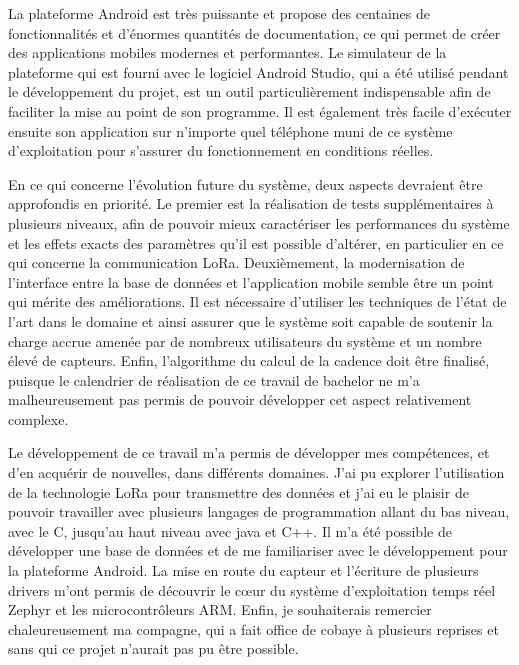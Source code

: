 La plateforme Android est très puissante et propose des centaines de fonctionnalités et d'énormes quantités de documentation, ce qui permet de créer des applications mobiles modernes et performantes. Le simulateur de la plateforme qui est fourni avec le logiciel Android Studio, qui a été utilisé pendant le développement du projet, est un outil particulièrement indispensable afin de faciliter la mise au point de son programme. Il est également très facile d'exécuter ensuite son application sur n'importe quel téléphone muni de ce système d'exploitation pour s'assurer du fonctionnement en conditions réelles.

En ce qui concerne l'évolution future du système, deux aspects devraient être approfondis en priorité. Le premier est la réalisation de tests supplémentaires à plusieurs niveaux, afin de pouvoir mieux caractériser les performances du système et les effets exacts des paramètres qu'il est possible d'altérer, en particulier en ce qui concerne la communication LoRa. Deuxièmement, la modernisation de l'interface entre la base de données et l'application mobile semble être un point qui mérite des améliorations. Il est nécessaire d'utiliser les techniques de l'état de l'art dans le domaine et ainsi assurer que le système soit capable de soutenir la charge accrue amenée par de nombreux utilisateurs du système et un nombre élevé de capteurs. Enfin, l'algorithme du calcul de la cadence doit être finalisé, puisque le calendrier de réalisation de ce travail de bachelor ne m'a malheureusement pas permis de pouvoir développer cet aspect relativement complexe.

Le développement de ce travail m'a permis de développer mes compétences, et d’en acquérir de nouvelles, dans différents domaines. J'ai pu explorer l'utilisation de la technologie LoRa pour transmettre des données et j'ai eu le plaisir de pouvoir travailler avec plusieurs langages de programmation allant du bas niveau, avec le C, jusqu'au haut niveau avec java et C++. Il m'a été possible de développer une base de données et de me familiariser avec le développement pour la plateforme Android. La mise en route du capteur et l'écriture de plusieurs drivers m'ont permis de découvrir le cœur du système d'exploitation temps réel Zephyr et les microcontrôleurs ARM. Enfin, je souhaiterais remercier chaleureusement ma compagne, qui a fait office de cobaye à plusieurs reprises et sans qui ce projet n'aurait pas pu être possible.
